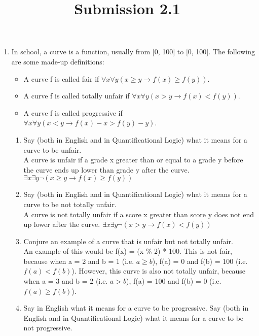 \documentclass{article}
\title{Submission 2.1}
\date{}
\begin{document}
\maketitle

\begin{enumerate}
      \item In school, a curve is a function, usually from [0, 100] to [0, 100]. The following are some made-up definitions:
            \begin{itemize}
                  \item A curve f is called fair if $\forall x \forall y (x \geq y \to f(x) \geq f(y))$.
                  \item A curve f is called totally unfair if $\forall x \forall y (x > y \to f(x) < f(y))$.
                  \item A curve f is called progressive if $\forall x \forall y (x < y \to f(x) - x > f(y) - y)$.
            \end{itemize}
            \begin{enumerate}
                  \item Say (both in English and in Quantificational Logic) what it means for a curve to be unfair.\\
                        A curve is unfair if a grade x greater than or equal to a grade y before the curve ends up lower than grade y after the curve. $\exists x \exists y \neg(x \geq y \to f(x) \geq f(y))$
                  \item Say (both in English and in Quantificational Logic) what it means for a curve to be not totally unfair.\\
                        A curve is not totally unfair if a score x greater than score y does not end up lower after the curve. $\exists x \exists y \neg(x > y \to f(x) < f(y))$
                  \item Conjure an example of a curve that is unfair but not totally unfair.\\
                        An example of this would be f(x) = (x \% 2) * 100. This is not fair, because when a = 2 and b = 1 (i.e. $a \geq b$), f(a) = 0 and f(b) = 100 (i.e. $f(a) < f(b)$). However, this curve is also not totally unfair, because when a = 3 and b = 2 (i.e. $a > b$), f(a) = 100 and f(b) = 0 (i.e. $f(a) \geq f(b)$).
                  \item Say in English what it means for a curve to be progressive. Say (both in English and in Quantificational Logic) what it means for a curve to be not progressive.\\

\end{enumerate}
\end{enumerate}
\end{document}
